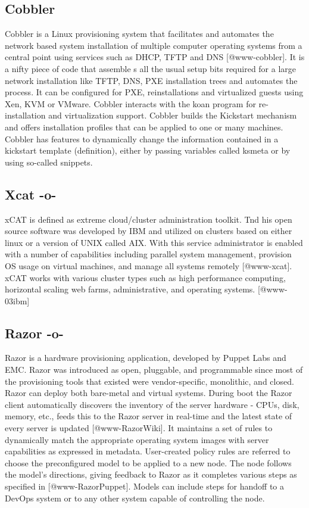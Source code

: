 \subsection{Cobbler}

Cobbler is a Linux provisioning system that facilitates and automates
the network based system installation of multiple computer operating
systems from a central point using services such as DHCP, TFTP and
DNS [@www-cobbler]. It is a nifty piece of code that assemble s
all the usual setup bits required for a large network installation
like TFTP, DNS, PXE installation trees and automates the process. It
can be configured for PXE, reinstallations and virtualized guests
using Xen, KVM or VMware.  Cobbler interacts with the koan program for
re-installation and virtualization support.  Cobbler builds the
Kickstart mechanism and offers installation profiles that can be
applied to one or many machines.  Cobbler has features to dynamically
change the information contained in a kickstart template (definition),
either by passing variables called ksmeta or by using so-called
snippets.

\subsection{Xcat -o-}

xCAT is defined as extreme cloud/cluster administration toolkit. Tnd
his open source software was developed by IBM and utilized on clusters
based on either linux or a version of UNIX called AIX. With this
service administrator is enabled with a number of capabilities
including parallel system management, provision OS usage on virtual
machines, and manage all systems remotely [@www-xcat]. xCAT works
with various cluster types such as high performance computing,
horizontal scaling web farms, administrative, and operating
systems. [@www-03ibm]


     
\subsection{Razor -o-}

Razor is a hardware provisioning application, developed by Puppet Labs
and EMC. Razor was introduced as open, pluggable, and programmable
since most of the provisioning tools that existed were
vendor-specific, monolithic, and closed. Razor can deploy both
bare-metal and virtual systems. During boot the Razor client
automatically discovers the inventory of the server hardware - CPUs,
disk, memory, etc., feeds this to the Razor server in real-time and
the latest state of every server is updated [@www-RazorWiki]. It
maintains a set of rules to dynamically match the appropriate
operating system images with server capabilities as expressed in
metadata. User-created policy rules are referred to choose the
preconfigured model to be applied to a new node. The node follows the
model's directions, giving feedback to Razor as it completes various
steps as specified in [@www-RazorPuppet]. Models can include steps
for handoff to a DevOps system or to any other system capable of
controlling the node.



